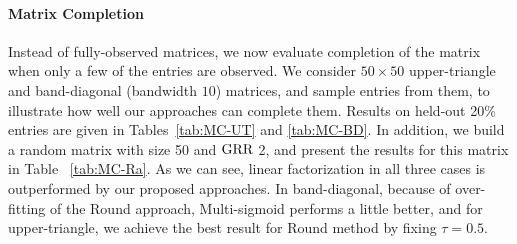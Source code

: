 \documentclass{article}
\newcommand{\sameer}[1]{\todo[color=blue!20]{\textbf{s:} #1}{}}
\begin{document}
\paragraph{Matrix Completion}
Instead of fully-observed matrices, we now evaluate completion of the matrix when only a few of the entries are observed. 
We consider $50\times50$ upper-triangle and band-diagonal (bandwidth $10$) matrices, and sample entries from them, to illustrate how well our approaches can complete them. 
Results on held-out 20\% entries are given in Tables~\ref{tab:MC-UT} and \ref{tab:MC-BD}. 
In addition, we build a random matrix with size 50 and $\text{GRR}$ 2, and present the results for this matrix in Table ~\ref{tab:MC-Ra}. 
As we can see, linear factorization in all three cases is outperformed by our proposed approaches. 
In band-diagonal, because of over-fitting of the Round approach, Multi-sigmoid performs a little better, and for upper-triangle, we achieve the best result for Round method by fixing $\tau=0.5$. %
\end{document}

